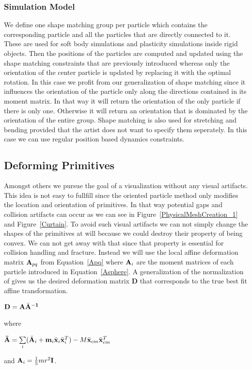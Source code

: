 \documentclass[
	11pt, 
	DIV10,
	a4paper, 
	oneside, 
	headings=normal, 
	captions=tableheading,
	final, 
	numbers=noenddot
]{scrartcl}
\begin{document}
\subsubsection{Simulation Model}
	We define one shape matching group per particle which contains the corresponding particle and all the particles that are directly connected to it. These are used for soft body simulations and plasticity simulations inside rigid objects. Then the positions of the particles are computed and updated using the shape matching constraints that are previously introduced whereas only the orientation of the center particle is updated by replacing it with the optimal rotation. In this case we profit from our generalization of shape matching since it influences the orientation of the particle only along the directions contained in its moment matrix.\cite{2} In that way it will return the orientation of the only particle if there is only one. Otherwise it will return an orientation that is dominated by the orientation of the entire group. Shape matching is also used for stretching and bending provided that the artist does not want to specify them seperately. In this case we can use regular position based dynamics constraints.

\subsection{Deforming Primitives}
	Amongst others we pursue the goal of a visualization without any visual artifacts. This idea is not easy to fullfill since the oriented particle method only modifies the location and orientation of primitives. In that way potential gaps and collision artifacts can occur as we can see in Figure~\ref{PhysicalMeshCreation_1} and Figure~\ref{Curtain}. To avoid such visual artifacts we can not simply change the shapes of the primitives at will because we could destroy their property of being convex. We can not get away with that since that property is essential for collision handling and fracture. Instead we will use the local affine deformation matrix $\mathnormal{\mathbf{A}_{pq}}$ from Equation~\ref{Apq} where $\mathnormal{\mathbf{A}_i}$ are the moment matrices of each particle introduced in Equation~\ref{Asphere}.
	A generalization of the normalization of \cite{11} gives us the desired deformation matrix \textbf{D} that corresponds to the true best fit affine transformation.
	\begin{center}
		$\mathnormal{\mathbf{D}}=\mathnormal{\mathbf{A \bar{A}^{-1}}}$
	\end{center} 
	\noindent where
	\begin{center}
		$\mathbf{\bar{A}}=\sum\limits_{i}(\mathnormal{\mathbf{\bar{A}}_i+\mathbf{m}_i\mathbf{\bar{x}}_i\mathbf{\bar{x}}_i^T})-M\mathnormal{\mathbf{\bar{x}}_{cm} \mathbf{\bar{x}}_{cm}^T}$
	\end{center}
\noindent and $\mathnormal{\mathbf{A}_{i}}=\frac{1}{5}mr^2\mathbf{I}$.
\end{document}
